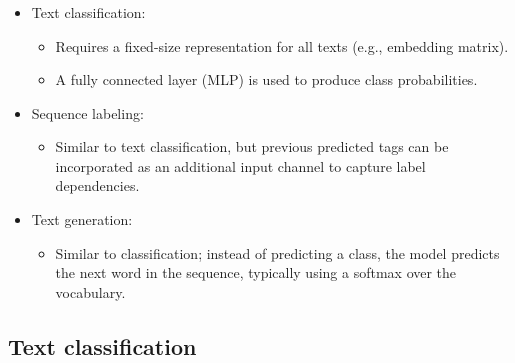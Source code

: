 \documentclass[xcolor=table]{beamer}
\begin{document}
\begin{frame}
	\frametitle{\insertshortsubtitle}
	\framesubtitle{\insertsection}
	
	\begin{itemize}
		\item Text classification:
		\begin{itemize}
			\item Requires a fixed-size representation for all texts (e.g., embedding matrix).
			\item A fully connected layer (MLP) is used to produce class probabilities.
		\end{itemize}
		
		\item Sequence labeling:
		\begin{itemize}
			\item Similar to text classification, but previous predicted tags can be incorporated as an additional input channel to capture label dependencies.
		\end{itemize}
		
		\item Text generation:
		\begin{itemize}
			\item Similar to classification; instead of predicting a class, the model predicts the next word in the sequence, typically using a softmax over the vocabulary.
		\end{itemize}
	\end{itemize}
	
\end{frame}

\subsection{Text classification}
\end{document}
